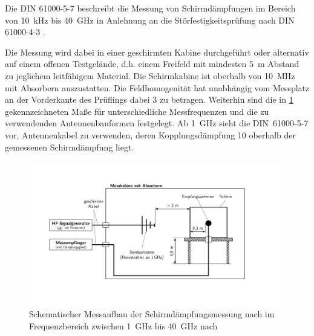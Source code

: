 Die DIN 61000-5-7 \cite{DIN_EN_61000-5-7} beschreibt die Messung von Schirmdämpfungen im Bereich von \SI{10}{\kilo\hertz} bis \SI{40}{\giga\hertz} in Anlehnung an die Störfestigkeitsprüfung nach DIN 61000-4-3 \cite{DIN_EN_61000-4-3}.
\par
\vspace{\linespace}
Die Messung wird dabei in einer geschirmten Kabine durchgeführt oder alternativ auf einem offenen Testgelände, d.h. einem Freifeld mit mindesten \SI{5}{\meter} Abstand zu jeglichem leitfähigem Material. Die Schirmkabine ist oberhalb von \SI{10}{\mega\hertz} mit Absorbern auszustatten. Die Feldhomogenität hat unabhängig vom Messplatz an der Vorderkante des Prüflings dabei \SI{3}{\Dezibel} zu betragen. Weiterhin sind die in \Abb\ref{fig:2_Schematik_Schirmdaempfungsmessung_DIN_61000-5-7} gekennzeichneten Maße für unterschiedliche Messfrequenzen und die zu verwendenden Antennenbauformen festgelegt. Ab \SI{1}{\giga\hertz} sieht die DIN~61000-5-7 vor, Antennenkabel zu verwenden, deren Kopplungsdämpfung \SI{10}{\Dezibel} oberhalb der gemessenen Schirmdämpfung liegt.
\par
\vspace{\linespace}


\begin{figure}[ht]
    \centering
    \includegraphics[page = 1, trim = 2cm 3cm 5cm 3cm, clip, width=.9\textwidth]{Abbildungen/Kapitel2/Schematiken_Schirmdaempfungsmessung.pdf}
    \caption[Schematischer Messaufbau der Schirmdämpfungsmessung nach \citeauthor{DIN_EN_61000-5-7} im Frequenzbereich zwischen \SI{1}{\giga\hertz} bis \SI{40}{\giga\hertz}]{Schematischer Messaufbau der Schirmdämpfungsmessung nach \citeauthor{DIN_EN_61000-5-7} im Frequenzbereich zwischen \SI{1}{\giga\hertz} bis \SI{40}{\giga\hertz} nach~\cite{DIN_EN_61000-5-7}}
    \label{fig:2_Schematik_Schirmdaempfungsmessung_DIN_61000-5-7}
\end{figure}


